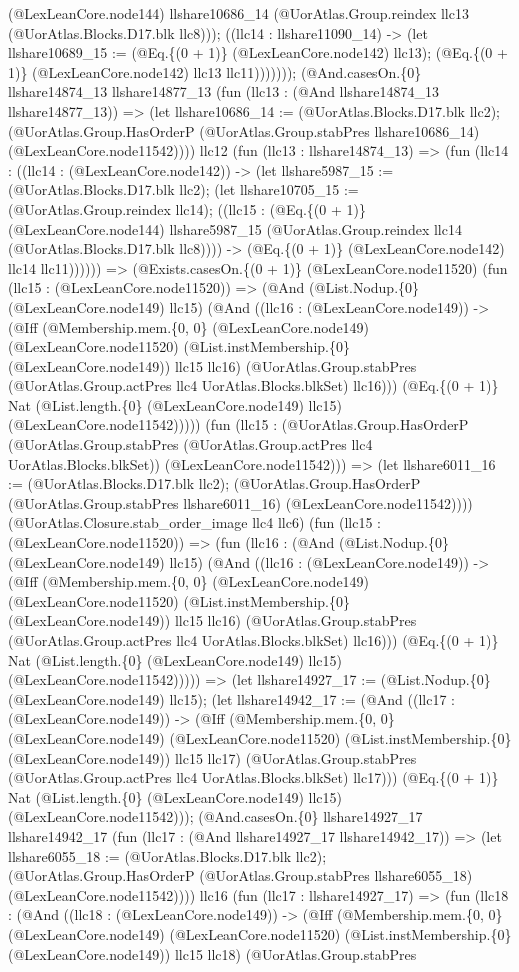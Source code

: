\documentclass[11pt]{article}
\begin{document}
(@LexLeanCore.node144) llshare10686\_14 (@UorAtlas.Group.reindex llc13 (@UorAtlas.Blocks.D17.blk llc8))); ((llc14 : llshare11090\_14) -> (let llshare10689\_15 := (@Eq.\{(0 + 1)\} (@LexLeanCore.node142) llc13); (@Eq.\{(0 + 1)\} (@LexLeanCore.node142) llc13 llc11))))))); (@And.casesOn.\{0\} llshare14874\_13 llshare14877\_13 (fun (llc13 : (@And llshare14874\_13 llshare14877\_13)) => (let llshare10686\_14 := (@UorAtlas.Blocks.D17.blk llc2); (@UorAtlas.Group.HasOrderP (@UorAtlas.Group.stabPres llshare10686\_14) (@LexLeanCore.node11542)))) llc12 (fun (llc13 : llshare14874\_13) => (fun (llc14 : ((llc14 : (@LexLeanCore.node142)) -> (let llshare5987\_15 := (@UorAtlas.Blocks.D17.blk llc2); (let llshare10705\_15 := (@UorAtlas.Group.reindex llc14); ((llc15 : (@Eq.\{(0 + 1)\} (@LexLeanCore.node144) llshare5987\_15 (@UorAtlas.Group.reindex llc14 (@UorAtlas.Blocks.D17.blk llc8)))) -> (@Eq.\{(0 + 1)\} (@LexLeanCore.node142) llc14 llc11)))))) => (@Exists.casesOn.\{(0 + 1)\} (@LexLeanCore.node11520) (fun (llc15 : (@LexLeanCore.node11520)) => (@And (@List.Nodup.\{0\} (@LexLeanCore.node149) llc15) (@And ((llc16 : (@LexLeanCore.node149)) -> (@Iff (@Membership.mem.\{0, 0\} (@LexLeanCore.node149) (@LexLeanCore.node11520) (@List.instMembership.\{0\} (@LexLeanCore.node149)) llc15 llc16) (@UorAtlas.Group.stabPres (@UorAtlas.Group.actPres llc4 UorAtlas.Blocks.blkSet) llc16))) (@Eq.\{(0 + 1)\} Nat (@List.length.\{0\} (@LexLeanCore.node149) llc15) (@LexLeanCore.node11542))))) (fun (llc15 : (@UorAtlas.Group.HasOrderP (@UorAtlas.Group.stabPres (@UorAtlas.Group.actPres llc4 UorAtlas.Blocks.blkSet)) (@LexLeanCore.node11542))) => (let llshare6011\_16 := (@UorAtlas.Blocks.D17.blk llc2); (@UorAtlas.Group.HasOrderP (@UorAtlas.Group.stabPres llshare6011\_16) (@LexLeanCore.node11542)))) (@UorAtlas.Closure.stab\_order\_image llc4 llc6) (fun (llc15 : (@LexLeanCore.node11520)) => (fun (llc16 : (@And (@List.Nodup.\{0\} (@LexLeanCore.node149) llc15) (@And ((llc16 : (@LexLeanCore.node149)) -> (@Iff (@Membership.mem.\{0, 0\} (@LexLeanCore.node149) (@LexLeanCore.node11520) (@List.instMembership.\{0\} (@LexLeanCore.node149)) llc15 llc16) (@UorAtlas.Group.stabPres (@UorAtlas.Group.actPres llc4 UorAtlas.Blocks.blkSet) llc16))) (@Eq.\{(0 + 1)\} Nat (@List.length.\{0\} (@LexLeanCore.node149) llc15) (@LexLeanCore.node11542))))) => (let llshare14927\_17 := (@List.Nodup.\{0\} (@LexLeanCore.node149) llc15); (let llshare14942\_17 := (@And ((llc17 : (@LexLeanCore.node149)) -> (@Iff (@Membership.mem.\{0, 0\} (@LexLeanCore.node149) (@LexLeanCore.node11520) (@List.instMembership.\{0\} (@LexLeanCore.node149)) llc15 llc17) (@UorAtlas.Group.stabPres (@UorAtlas.Group.actPres llc4 UorAtlas.Blocks.blkSet) llc17))) (@Eq.\{(0 + 1)\} Nat (@List.length.\{0\} (@LexLeanCore.node149) llc15) (@LexLeanCore.node11542))); (@And.casesOn.\{0\} llshare14927\_17 llshare14942\_17 (fun (llc17 : (@And llshare14927\_17 llshare14942\_17)) => (let llshare6055\_18 := (@UorAtlas.Blocks.D17.blk llc2); (@UorAtlas.Group.HasOrderP (@UorAtlas.Group.stabPres llshare6055\_18) (@LexLeanCore.node11542)))) llc16 (fun (llc17 : llshare14927\_17) => (fun (llc18 : (@And ((llc18 : (@LexLeanCore.node149)) -> (@Iff (@Membership.mem.\{0, 0\} (@LexLeanCore.node149) (@LexLeanCore.node11520) (@List.instMembership.\{0\} (@LexLeanCore.node149)) llc15 llc18) (@UorAtlas.Group.stabPres 
\end{document}
